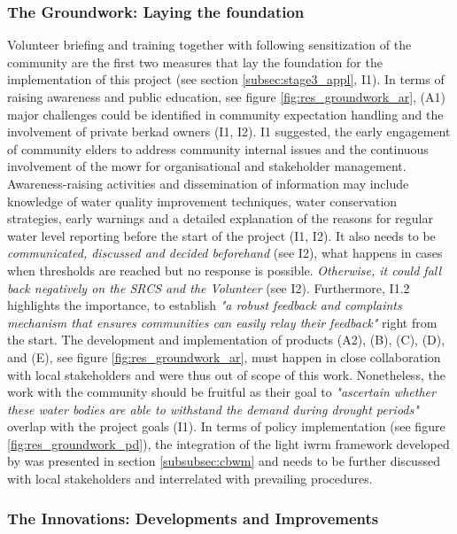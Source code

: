 \subsubsection{The Groundwork: Laying the foundation}\label{subsubsec:groundwork_appl}

Volunteer briefing and training together with following sensitization of the community are the first two measures that lay the foundation for the implementation of this project (see section \ref{subsec:stage3_appl}, I1). In terms of raising awareness and public education, see figure \ref{fig:res_groundwork_ar}, (A1) major challenges could be identified in community expectation handling and the involvement of private berkad owners (I1, I2). I1 suggested, the early engagement of community elders to address community internal issues and the continuous involvement of the \acrshort{mowr} for organisational and stakeholder management. Awareness-raising activities and dissemination of information may include knowledge of water quality improvement techniques, water conservation strategies, early warnings and a detailed explanation of the reasons for regular water level reporting before the start of the project (I1, I2). It also needs to be \textit{communicated, discussed and decided beforehand} (see I2), what happens in cases when thresholds are reached but no response is possible. \textit{Otherwise, it could fall back negatively on the SRCS and the Volunteer} (see I2). Furthermore, I1.2 highlights the importance, to establish \textit{"a robust feedback and complaints mechanism that ensures communities can easily relay their feedback"} right from the start. The development and implementation of products (A2), (B), (C), (D), and (E), see figure \ref{fig:res_groundwork_ar}, must happen in close collaboration with local stakeholders and were thus out of scope of this work. Nonetheless, the work with the community should be fruitful as their goal to \textit{"ascertain whether these water bodies are able to withstand the demand during drought periods"} overlap with the project goals (I1).\newline
In terms of policy implementation (see figure \ref{fig:res_groundwork_pd}), the integration of the light \acrshort{iwrm} framework developed by \textcite{dayCommunitybasedWaterResources2009} was presented in section \ref{subsubsec:cbwm} and needs to be further discussed with local stakeholders and interrelated with prevailing procedures.

\subsubsection{The Innovations: Developments and Improvements}\label{subsubsec:innovations_appl}

